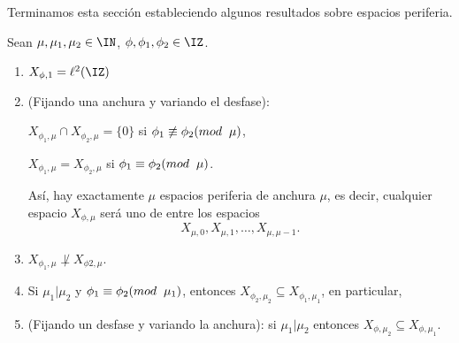 Terminamos esta sección estableciendo
algunos resultados sobre espacios periferia.

\begin{lema}
\label{teo:hechos espacios periferia}
Sean $\mu, \mu_{1}, \mu_{2} \in \IN$, $\phi, \phi_{1}, \phi_{2} \in \IZ$.
\begin{enumerate}
\item $X_{\phi, 1}= \ell^{2}(\IZ) $ 
\item (Fijando una anchura y variando el desfase):
\begin{center}
$X_{\phi_{1}, \mu} \cap X_{\phi_{2}, \mu} = \{ 0 \} $
si  $\phi_{1} \not\equiv \phi_{2} (mod \hspace{0.2cm} \mu)$,
\end{center}

\begin{center}
$X_{\phi_{1}, \mu } = X_{\phi_{2}, \mu} $
si $\phi_{1} \equiv \phi_{2} (mod \hspace{0.2cm} \mu)$.
\end{center}
Así, hay exactamente $\mu$ espacios 
periferia de anchura $\mu$, es decir,
cualquier espacio $X_{\phi, \mu }$ será uno de entre
los espacios
\[
X_{\mu , 0}, X_{\mu , 1} , \ldots , X_{\mu , \mu -1}.
\]

\item
$ X_{\phi_{1}, \mu} \not\perp X_{\phi{2}, \mu} $.


\item Si
$\mu_{1} | \mu_{2} $ y $\phi_{1} \equiv \phi_{2} (mod \hspace{0.2cm} \mu_{1})$,
entonces
$X_{\phi_{2}, \mu_{2}} \subseteq X_{\phi_{1}, \mu_{1}} $, 
en particular, 

\item (Fijando un desfase y variando la anchura):
 si $\mu_{1} | \mu_{2} $  entonces 
$X_{\phi, \mu_{2}} \subseteq X_{\phi, \mu_{1}} $.
\end{enumerate}
\end{lema}
